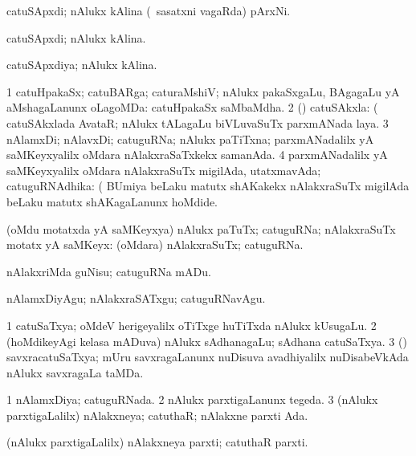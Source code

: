\bentry
{}
\gl{\nA}
\bmng
catuSApxdi; nAlukx kAlina (\kanmu\ sasatxni vagaRda) pArxNi. 
\emng
\eentry

\bentry
{}
\gl{\gu}
\bmng
catuSApxdi; nAlukx kAlina. 
\emng
\eentry

\bentry
{}
\gl{\gu}
\bmng
catuSApxdiya; nAlukx kAlina. 
\emng
\eentry

\bentry
{}
\gl{\gu}
\bmng
\bnum
\num{1} catuHpakaSx; catuBARga; caturaMshiV; nAlukx pakaSxgaLu, BAgagaLu yA aMshagaLanunx oLagoMDa:  catuHpakaSx saMbaMdha. 
\num{2} (\saM) catuSAkxla:  (  catuSAkxlada AvataR; nAlukx tALagaLu biVLuvaSuTx parxmANada laya. 
\num{3} nAlamxDi; nAlavxDi; catuguRNa; nAlukx paTiTxna; parxmANadalilx yA saMKeyxyalilx oMdara nAlakxraSaTxkekx samanAda. 
\num{4} parxmANadalilx yA saMKeyxyalilx oMdara nAlakxraSuTx migilAda, utatxmavAda; catuguRNAdhika:  (  BUmiya beLaku matutx shAKakekx nAlakxraSuTx migilAda beLaku matutx shAKagaLanunx hoMdide. 
\enum
\emng
\eentry


\bentry
{}
\gl{\nA}
\bmng
(oMdu motatxda yA saMKeyxya) nAlukx paTuTx; catuguRNa; nAlakxraSuTx motatx yA saMKeyx:  (oMdara) nAlakxraSuTx; catuguRNa. 
\emng
\eentry


\bentry
{}
\gl{\sakirx}
\bmng
nAlakxriMda guNisu; catuguRNa mADu. 
\emng

\noindent
\gl{\akirx}
\bmng
nAlamxDiyAgu; nAlakxraSATxgu; catuguRNavAgu. 
\emng
\eentry


\bentry
{}
\gl{\nA}
\bmng
\bnum
\num{1} catuSaTxya; oMdeV herigeyalilx oTiTxge huTiTxda nAlukx kUsugaLu. 
\num{2} (hoMdikeyAgi kelasa mADuva) nAlukx sAdhanagaLu; sAdhana catuSaTxya. 
\num{3} (\saM) savxracatuSaTxya; mUru savxragaLanunx nuDisuva avadhiyalilx nuDisabeVkAda nAlukx savxragaLa taMDa. 
\enum
\emng
\eentry


\bentry
{}
\gl{\gu}
\bmng
\bnum
\num{1} nAlamxDiya; catuguRNada. 
\num{2} nAlukx parxtigaLanunx tegeda. 
\num{3} (nAlukx parxtigaLalilx) nAlakxneya; catuthaR; nAlakxne parxti Ada. 
\enum
\emng
\eentry


\bentry
{}
\gl{\nA}
\bmng
(nAlukx parxtigaLalilx) nAlakxneya parxti; catuthaR parxti. 
\emng

